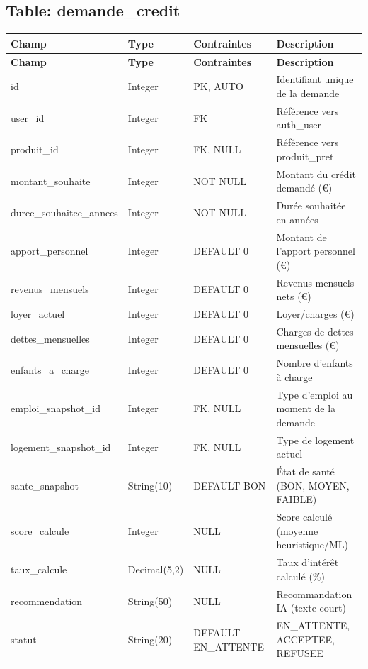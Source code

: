 \documentclass[12pt,a4paper]{report}
\begin{document}
\subsection{Table: demande\_credit}
\begin{longtable}{|p{3.5cm}|p{2.5cm}|p{2cm}|p{6cm}|}
\hline
\rowcolor{banquiseblue!30}
\textbf{Champ} & \textbf{Type} & \textbf{Contraintes} & \textbf{Description} \\
\hline
\endfirsthead
\hline
\rowcolor{banquiseblue!30}
\textbf{Champ} & \textbf{Type} & \textbf{Contraintes} & \textbf{Description} \\
\hline
\endhead

id & Integer & PK, AUTO & Identifiant unique de la demande \\
\hline
user\_id & Integer & FK & Référence vers auth\_user \\
\hline
produit\_id & Integer & FK, NULL & Référence vers produit\_pret \\
\hline
montant\_souhaite & Integer & NOT NULL & Montant du crédit demandé (€) \\
\hline
duree\_souhaitee\_annees & Integer & NOT NULL & Durée souhaitée en années \\
\hline
apport\_personnel & Integer & DEFAULT 0 & Montant de l'apport personnel (€) \\
\hline
revenus\_mensuels & Integer & DEFAULT 0 & Revenus mensuels nets (€) \\
\hline
loyer\_actuel & Integer & DEFAULT 0 & Loyer/charges (€) \\
\hline
dettes\_mensuelles & Integer & DEFAULT 0 & Charges de dettes mensuelles (€) \\
\hline
enfants\_a\_charge & Integer & DEFAULT 0 & Nombre d'enfants à charge \\
\hline
emploi\_snapshot\_id & Integer & FK, NULL & Type d'emploi au moment de la demande \\
\hline
logement\_snapshot\_id & Integer & FK, NULL & Type de logement actuel \\
\hline
sante\_snapshot & String(10) & DEFAULT BON & État de santé (BON, MOYEN, FAIBLE) \\
\hline
score\_calcule & Integer & NULL & Score calculé (moyenne heuristique/ML) \\
\hline
taux\_calcule & Decimal(5,2) & NULL & Taux d'intérêt calculé (\%) \\
\hline
recommendation & String(50) & NULL & Recommandation IA (texte court) \\
\hline
statut & String(20) & DEFAULT EN\_ATTENTE & EN\_ATTENTE, ACCEPTEE, REFUSEE \\

\end{longtable}
\end{document}
